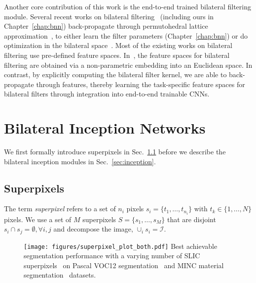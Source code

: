 Another core contribution of this work is the end-to-end trained bilateral filtering
module.
Several recent works on bilateral filtering~\cite{barron2015bilateral,barron2015defocus}
(including ours in Chapter~\ref{chap:bnn})
back-propagate through permutohedral lattice approximation~\cite{adams2010fast}, to either learn the
filter parameters (Chapter~\ref{chap:bnn}) or do optimization in the
bilateral space~\cite{barron2015bilateral,barron2015defocus}. Most of the existing works
on bilateral filtering use pre-defined feature spaces. In~\cite{campbell2013fully}, the feature
spaces for bilateral filtering are obtained via a non-parametric embedding into
an Euclidean space. In contrast, by explicitly computing the bilateral filter kernel,
we are able to back-propagate through features, thereby learning
the task-specific feature spaces for bilateral filters through integration into
end-to-end trainable CNNs.


\section{Bilateral Inception Networks}

We first formally introduce superpixels in Sec.~\ref{sec:superpixels} before we
describe the bilateral inception modules in Sec.~\ref{sec:inception}.

\subsection{Superpixels}\label{sec:superpixels}

The term \emph{superpixel} refers to a set of $n_i$ pixels $s_i=\{t_1,\ldots,t_{n_i}\}$ with
$t_k\in\{1,\ldots,N\}$ pixels. We use a set of $M$ superpixels $S=\{s_1,\ldots,s_M\}$
that are disjoint $s_i\cap s_j=\emptyset, \forall i,j$ and decompose the image,
$\cup_i s_i = \mathcal{I}$.

\begin{figure}[t]
  \centering
\texttt{[image: figures/superpixel\_plot\_both.pdf]}
   {Best achievable segmentation
    performance with a varying number
    of SLIC superpixels~\cite{achanta2012slic} on Pascal VOC12 segmentation~\cite{voc2012segmentation} and MINC material
    segmentation~\cite{bell2015minc} datasets.}
    \label{fig:quantization}
\end{figure}


